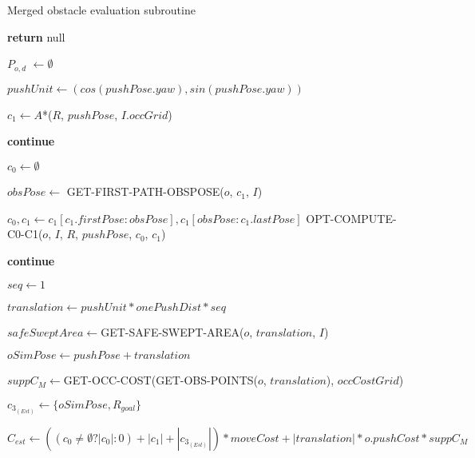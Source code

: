 \begin{algorithm}[H]

  \caption{Merged obstacle evaluation subroutine}

  \label{alg:07-custom-merge-optimized-planforobstacle-part1}

  \begin{algorithmic}[1]


        \State \textbf{return} null
      \EndIf

      \State $P_{o,d}$ $\gets \emptyset$

        \State $pushUnit \gets (cos(pushPose.yaw), sin(pushPose.yaw))$

        \State $c_{1} \gets A$*($R$, $pushPose$, $I.occGrid$)

          \State \textbf{continue}
        \EndIf

        \State $c_{0} \gets \emptyset$


          \State $obsPose \gets$ GET-FIRST-PATH-OBSPOSE($o$, $c_{1}$, $I$)

            \State $c_{0}, c_{1} \gets c_{1}[c_{1}.firstPose:obsPose], c_{1}[obsPose:c_{1}.lastPose]$
          \Else
            \State OPT-COMPUTE-C0-C1($o$, $I$, $R$, $pushPose$, $c_{0}$, $c_{1}$)

              \State \textbf{continue}
            \EndIf
          \EndIf
        \EndIf

        \State $seq \gets 1$

        \State $translation \gets pushUnit * onePushDist * seq$

        \State $safeSweptArea \gets $GET-SAFE-SWEPT-AREA($o$, $translation$, $I$)

        \State $oSimPose \gets pushPose + translation$

        \State $suppC_{M} \gets $GET-OCC-COST(GET-OBS-POINTS($o$, $translation$), $occCostGrid$)

        \State $c_{3_{(Est)}} \gets \{oSimPose, R_{goal}\}$

        \State $C_{est} \gets ((c_{0} \neq \emptyset ? |c_{0}| : 0) + |c_{1}| + |c_{3_{(Est)}}|) * moveCost + |translation| * o.pushCost * suppC_{M}$


  \end{algorithmic}
\end{algorithm}

